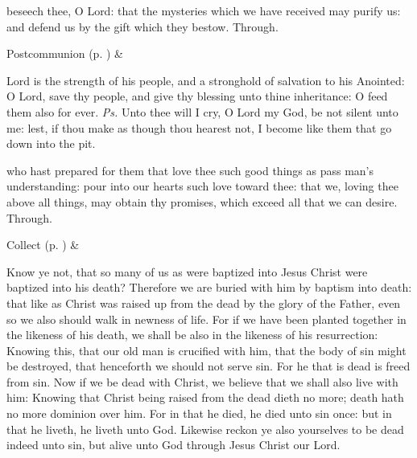 \postcommunion
{} beseech thee, O Lord: that the mysteries which we have received may purify us: and defend us by the gift which they bestow. Through.


\begin{rubric}
     Postcommunion  (p. \pageref{SPSaints}) \&  
\end{rubric}


\clearpage
{}


\introit
{} Lord is the strength of his people, and a stronghold of salvation to his Anointed: O Lord, save thy people, and give thy blessing unto thine inheritance: O feed them also for ever. \textit{Ps.} Unto thee will I cry, O Lord my God, be not silent unto me: lest, if thou make as though thou hearest not, I become like them that go down into the pit.

\collect
{} who hast prepared for them that love thee such good things as pass man's understanding: pour into our hearts such love toward thee: that we, loving thee above all things, may obtain thy promises, which exceed all that we can desire. Through.
\begin{rubric}
     Collect  (p. \pageref{SPSaints}) \&  
\end{rubric}

 Know ye not, that so many of us as were baptized into Jesus Christ were baptized into his death? Therefore we are buried with him by baptism into death: that like as Christ was raised up from the dead by the glory of the Father, even so we also should walk in newness of life. For if we have been planted together in the likeness of his death, we shall be also in the likeness of his resurrection: Knowing this, that our old man is crucified with him, that the body of sin might be destroyed, that henceforth we should not serve sin. For he that is dead is freed from sin. Now if we be dead with Christ, we believe that we shall also live with him: Knowing that Christ being raised from the dead dieth no more; death hath no more dominion over him. For in that he died, he died unto sin once: but in that he liveth, he liveth unto God. Likewise reckon ye also yourselves to be dead indeed unto sin, but alive unto God through Jesus Christ our Lord.

